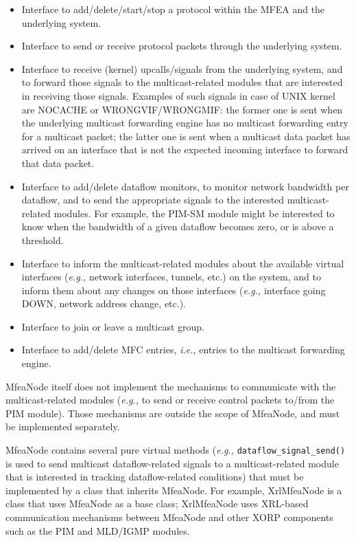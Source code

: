 \documentclass[11pt]{article}
\newcommand{\ie}{\emph{i.e.,}\xspace}
\newcommand{\eg}{\emph{e.g.,}\xspace}
\begin{document}
\begin{itemize}

  \item Interface to add/delete/start/stop a protocol within the MFEA
  and the underlying system.

  \item Interface to send or receive protocol packets through the
  underlying system.

  \item Interface to receive (kernel) upcalls/signals from the
  underlying system, and to forward those signals to the
  multicast-related modules that are interested in receiving those
  signals. Examples of such signals in case of UNIX kernel are NOCACHE or
  WRONGVIF/WRONGMIF: the former one is sent when the underlying multicast
  forwarding engine has no multicast forwarding entry for a multicast
  packet; the latter one is sent when a multicast data packet has
  arrived on an interface that is not the expected incoming interface to
  forward that data packet.

  \item Interface to add/delete dataflow monitors, to monitor network
  bandwidth per dataflow, and to send the appropriate signals to the
  interested multicast-related modules. For example, the PIM-SM module
  might be interested to know when the bandwidth of a given dataflow becomes
  zero, or is above a threshold.

  \item Interface to inform the multicast-related modules about the
  available virtual interfaces (\eg network interfaces, tunnels, etc.) on
  the system, and to inform them about any changes on those interfaces
  (\eg interface going DOWN, network address change, etc.).

  \item Interface to join or leave a multicast group.

  \item Interface to add/delete MFC entries, \ie entries to the
  multicast forwarding engine.

\end{itemize}

MfeaNode itself does not implement the mechanisms to communicate with
the multicast-related modules (\eg to send or receive control packets
to/from the PIM module). Those mechanisms are outside the scope of
MfeaNode, and must be implemented separately.

MfeaNode contains several pure virtual methods (\eg
\verb=dataflow_signal_send()= is used to send multicast dataflow-related
signals to a multicast-related module that is interested in tracking
dataflow-related conditions)
that must be implemented by a class that inherits MfeaNode.
For example, XrlMfeaNode is a class that uses MfeaNode as a base class;
XrlMfeaNode uses XRL-based communication mechanisms between MfeaNode
and other XORP components such as the PIM and MLD/IGMP modules.
\end{document}
